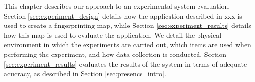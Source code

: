 This chapter describes our approach to an experimental system evaluation.
Section \ref{sec:experiment_design} details how the application described in xxx is used to create a fingerprinting map, while Section \ref{sec:experiment_results} details how this map is used to evaluate the application.
We detail the physical environment in which the experiments are carried out, which items are used when performing the experiment, and how data collection is conducted.
Section \ref{sec:experiment_results} evaluates the results of the system in terms of adequate acucracy, as described in Section \ref{sec:presence_intro}. 